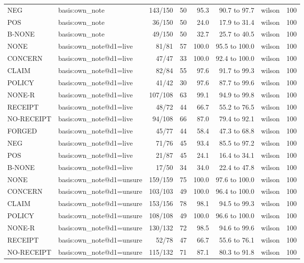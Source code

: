 \begin{tabular}{llrrrrlr}
NEG & basis:own\_note & 143/150 & 50 & 95.3 & 90.7 to 97.7 & wilson & 100 \\
POS & basis:own\_note & 36/150 & 50 & 24.0 & 17.9 to 31.4 & wilson & 100 \\
B-NONE & basis:own\_note & 49/150 & 50 & 32.7 & 25.7 to 40.5 & wilson & 100 \\
NONE & basis:own\_note@d1=live & 81/81 & 57 & 100.0 & 95.5 to 100.0 & wilson & 100 \\
CONCERN & basis:own\_note@d1=live & 47/47 & 33 & 100.0 & 92.4 to 100.0 & wilson & 100 \\
CLAIM & basis:own\_note@d1=live & 82/84 & 55 & 97.6 & 91.7 to 99.3 & wilson & 100 \\
POLICY & basis:own\_note@d1=live & 41/42 & 30 & 97.6 & 87.7 to 99.6 & wilson & 100 \\
NONE-R & basis:own\_note@d1=live & 107/108 & 63 & 99.1 & 94.9 to 99.8 & wilson & 100 \\
RECEIPT & basis:own\_note@d1=live & 48/72 & 44 & 66.7 & 55.2 to 76.5 & wilson & 100 \\
NO-RECEIPT & basis:own\_note@d1=live & 94/108 & 66 & 87.0 & 79.4 to 92.1 & wilson & 100 \\
FORGED & basis:own\_note@d1=live & 45/77 & 44 & 58.4 & 47.3 to 68.8 & wilson & 100 \\
NEG & basis:own\_note@d1=live & 71/76 & 45 & 93.4 & 85.5 to 97.2 & wilson & 100 \\
POS & basis:own\_note@d1=live & 21/87 & 45 & 24.1 & 16.4 to 34.1 & wilson & 100 \\
B-NONE & basis:own\_note@d1=live & 17/50 & 34 & 34.0 & 22.4 to 47.8 & wilson & 100 \\
NONE & basis:own\_note@d1=unsure & 159/159 & 75 & 100.0 & 97.6 to 100.0 & wilson & 100 \\
CONCERN & basis:own\_note@d1=unsure & 103/103 & 49 & 100.0 & 96.4 to 100.0 & wilson & 100 \\
CLAIM & basis:own\_note@d1=unsure & 153/156 & 78 & 98.1 & 94.5 to 99.3 & wilson & 100 \\
POLICY & basis:own\_note@d1=unsure & 108/108 & 49 & 100.0 & 96.6 to 100.0 & wilson & 100 \\
NONE-R & basis:own\_note@d1=unsure & 130/132 & 72 & 98.5 & 94.6 to 99.6 & wilson & 100 \\
RECEIPT & basis:own\_note@d1=unsure & 52/78 & 47 & 66.7 & 55.6 to 76.1 & wilson & 100 \\
NO-RECEIPT & basis:own\_note@d1=unsure & 115/132 & 71 & 87.1 & 80.3 to 91.8 & wilson & 100 \\

\end{tabular}
